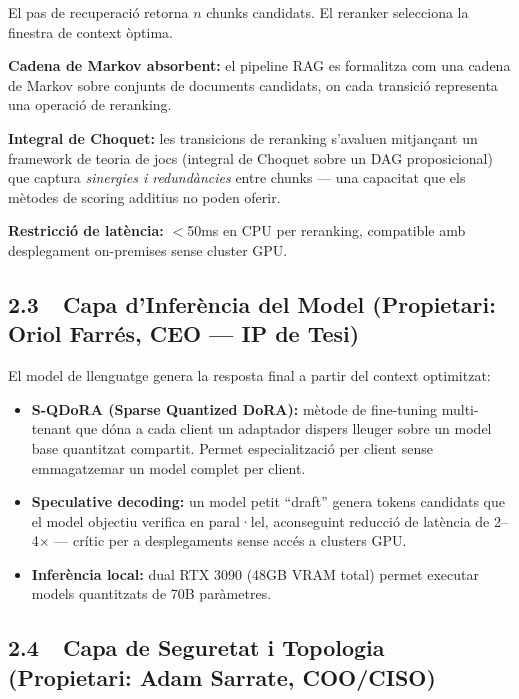 \documentclass[11pt,a4paper]{article}
\begin{document}
\begin{ipbox}[title={\color{accent}IP Propietària: Formalització Markov + Choquet}]
El pas de recuperació retorna $n$ chunks candidats. El reranker selecciona la finestra de context òptima.

\textbf{Cadena de Markov absorbent:} el pipeline RAG es formalitza com una cadena de Markov sobre conjunts de documents candidats, on cada transició representa una operació de reranking.

\textbf{Integral de Choquet:} les transicions de reranking s'avaluen mitjançant un framework de teoria de jocs (integral de Choquet sobre un DAG proposicional) que captura \textit{sinergies i redundàncies} entre chunks --- una capacitat que els mètodes de scoring additius no poden oferir.

\textbf{Restricció de latència:} $<$50ms en CPU per reranking, compatible amb desplegament on-premises sense cluster GPU.
\end{ipbox}

\subsection{2.3~~Capa d'Inferència del Model \textnormal{\small (Propietari: Oriol Farrés, CEO --- IP de Tesi)}}

El model de llenguatge genera la resposta final a partir del context optimitzat:

\begin{itemize}[leftmargin=1.5em,itemsep=2pt]
\item \textbf{S-QDoRA (Sparse Quantized DoRA):} mètode de fine-tuning multi-tenant que dóna a cada client un adaptador dispers lleuger sobre un model base quantitzat compartit. Permet especialització per client sense emmagatzemar un model complet per client.
\item \textbf{Speculative decoding:} un model petit ``draft'' genera tokens candidats que el model objectiu verifica en paral·lel, aconseguint reducció de latència de 2--4$\times$ --- crític per a desplegaments sense accés a clusters GPU.
\item \textbf{Inferència local:} dual RTX 3090 (48GB VRAM total) permet executar models quantitzats de 70B paràmetres.
\end{itemize}

\subsection{2.4~~Capa de Seguretat i Topologia \textnormal{\small (Propietari: Adam Sarrate, COO/CISO)}}
\end{document}

